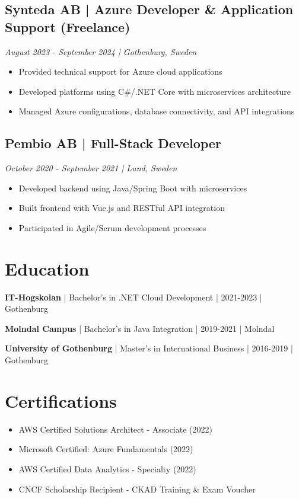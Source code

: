 \documentclass[11pt,a4paper]{article}
\begin{document}
\subsection*{Synteda AB | Azure Developer \& Application Support (Freelance)}
\textit{August 2023 - September 2024 | Gothenburg, Sweden}

\begin{itemize}[leftmargin=*, itemsep=2pt]
\item Provided technical support for Azure cloud applications
\item Developed platforms using C\#/.NET Core with microservices architecture
\item Managed Azure configurations, database connectivity, and API integrations
\end{itemize}

\subsection*{Pembio AB | Full-Stack Developer}
\textit{October 2020 - September 2021 | Lund, Sweden}

\begin{itemize}[leftmargin=*, itemsep=2pt]
\item Developed backend using Java/Spring Boot with microservices
\item Built frontend with Vue.js and RESTful API integration
\item Participated in Agile/Scrum development processes
\end{itemize}

\section*{Education}

\textbf{IT-Hogskolan} | Bachelor's in .NET Cloud Development | 2021-2023 | Gothenburg

\textbf{Molndal Campus} | Bachelor's in Java Integration | 2019-2021 | Molndal

\textbf{University of Gothenburg} | Master's in International Business | 2016-2019 | Gothenburg

\section*{Certifications}

\begin{itemize}[leftmargin=*, itemsep=2pt]
\item AWS Certified Solutions Architect - Associate (2022)
\item Microsoft Certified: Azure Fundamentals (2022)
\item AWS Certified Data Analytics - Specialty (2022)
\item CNCF Scholarship Recipient - CKAD Training \& Exam Voucher
\end{itemize}
\end{document}
